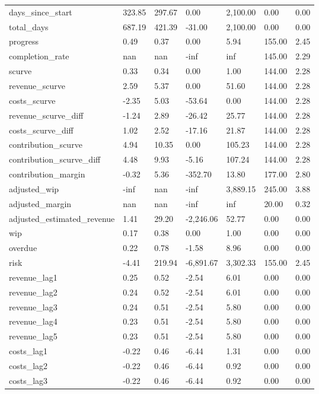 \begin{landscape}
\begin{longtable}[h!]{lllllll}
days_since_start & 323.85 & 297.67 & 0.00 & 2,100.00 & 0.00 & 0.00 \\
total_days & 687.19 & 421.39 & -31.00 & 2,100.00 & 0.00 & 0.00 \\
progress & 0.49 & 0.37 & 0.00 & 5.94 & 155.00 & 2.45 \\
completion_rate & nan & nan & -inf & inf & 145.00 & 2.29 \\
scurve & 0.33 & 0.34 & 0.00 & 1.00 & 144.00 & 2.28 \\
revenue_scurve & 2.59 & 5.37 & 0.00 & 51.60 & 144.00 & 2.28 \\
costs_scurve & -2.35 & 5.03 & -53.64 & 0.00 & 144.00 & 2.28 \\
revenue_scurve_diff & -1.24 & 2.89 & -26.42 & 25.77 & 144.00 & 2.28 \\
costs_scurve_diff & 1.02 & 2.52 & -17.16 & 21.87 & 144.00 & 2.28 \\
contribution_scurve & 4.94 & 10.35 & 0.00 & 105.23 & 144.00 & 2.28 \\
contribution_scurve_diff & 4.48 & 9.93 & -5.16 & 107.24 & 144.00 & 2.28 \\
contribution_margin & -0.32 & 5.36 & -352.70 & 13.80 & 177.00 & 2.80 \\
adjusted_wip & -inf & nan & -inf & 3,889.15 & 245.00 & 3.88 \\
adjusted_margin & nan & nan & -inf & inf & 20.00 & 0.32 \\
adjusted_estimated_revenue & 1.41 & 29.20 & -2,246.06 & 52.77 & 0.00 & 0.00 \\
wip & 0.17 & 0.38 & 0.00 & 1.00 & 0.00 & 0.00 \\
overdue & 0.22 & 0.78 & -1.58 & 8.96 & 0.00 & 0.00 \\
risk & -4.41 & 219.94 & -6,891.67 & 3,302.33 & 155.00 & 2.45 \\
revenue_lag1 & 0.25 & 0.52 & -2.54 & 6.01 & 0.00 & 0.00 \\
revenue_lag2 & 0.24 & 0.52 & -2.54 & 6.01 & 0.00 & 0.00 \\
revenue_lag3 & 0.24 & 0.51 & -2.54 & 5.80 & 0.00 & 0.00 \\
revenue_lag4 & 0.23 & 0.51 & -2.54 & 5.80 & 0.00 & 0.00 \\
revenue_lag5 & 0.23 & 0.51 & -2.54 & 5.80 & 0.00 & 0.00 \\
costs_lag1 & -0.22 & 0.46 & -6.44 & 1.31 & 0.00 & 0.00 \\
costs_lag2 & -0.22 & 0.46 & -6.44 & 0.92 & 0.00 & 0.00 \\
costs_lag3 & -0.22 & 0.46 & -6.44 & 0.92 & 0.00 & 0.00 \\

\end{longtable}
\end{landscape}
